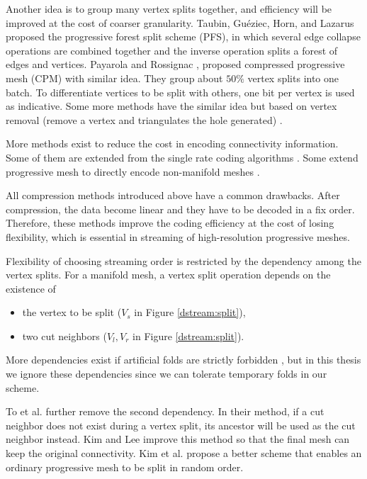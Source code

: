 \documentclass[11pt, a4paper]{report}
\begin{document}
    Another idea is to group many vertex splits together, 
    and efficiency will be improved at the cost of coarser granularity. 
    Taubin, Gu\'{e}ziec, Horn, and Lazarus \cite{280834} proposed the
    progressive forest split scheme (PFS), in which several edge
    collapse operations are combined together and the inverse operation splits a
    forest of edges and vertices. 
    Payarola and Rossignac \cite{614450}, 
    proposed compressed progressive mesh (CPM)\label{cpm} with similar
    idea. They group about $50\%$ vertex splits into one batch. To
    differentiate vertices to be split with others, one bit per vertex
    is used as indicative. 
    Some more methods have the similar idea
    but based on vertex removal (remove a vertex and triangulates the hole
    generated) \cite{319358}. 

    More methods exist to reduce the cost in encoding connectivity information.
    Some of them are extended from the single rate coding algorithms
    \cite{319426, 383281}. Some extend progressive mesh to directly
    encode non-manifold meshes \cite{258852}.

    All compression methods introduced above 
    have a common drawbacks. After compression, the 
    data become linear and they have to be decoded in a fix order. 
    Therefore, these methods improve the coding efficiency at the cost
    of losing flexibility, which is essential in streaming of high-resolution
    progressive meshes.
    
    Flexibility of choosing streaming order 
    is restricted by the dependency among the vertex splits.
    For a manifold mesh, a vertex split operation depends on the existence of
    \begin{itemize}
        \item 
    the vertex to be split ($V_s$ in Figure \ref{dstream:split}), 
        \item 
    two cut neighbors ($V_l, V_r$ in Figure \ref{dstream:split}). 
    \end{itemize}
    More dependencies exist if artificial folds are strictly forbidden \cite{258843, 258847}, 
    but in this thesis we ignore these dependencies since we can 
    tolerate temporary folds in our scheme.
     
    To et al. \cite{To1999} further remove the second dependency.
    In their method, if a cut neighbor does not exist during a vertex split,
    its ancestor will be used as the cut neighbor instead.
    Kim and Lee \cite{kim01truly} improve this method so that the final mesh
    can keep the original connectivity. 
    Kim et al. \cite{multiresolution:kim} propose a better scheme that enables
    an ordinary progressive mesh to be split in random order.
\end{document}
